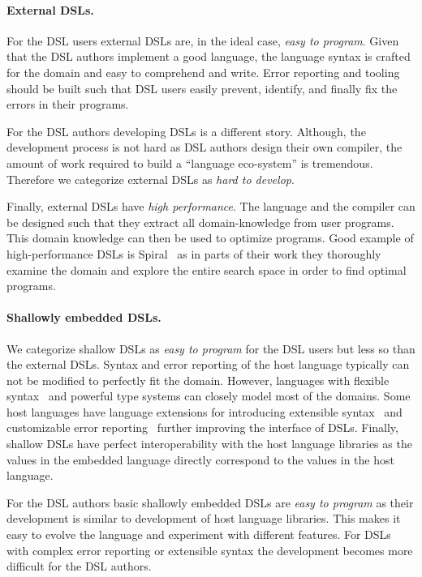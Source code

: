 \paragraph{External DSLs.} For the DSL users external DSLs are, in the ideal case, \emph{easy to program}. Given that
the DSL authors implement a good language, the language syntax is crafted for the domain
and easy to comprehend and write. Error reporting and tooling should be built such that DSL users
easily prevent, identify, and finally fix the errors in their programs.

For the DSL authors developing DSLs is a different story. Although, the development
process is not hard as DSL authors design their own compiler, the amount of work
required to build a ``language eco-system'' is tremendous. Therefore we categorize
external DSLs as \emph{hard to develop}.

Finally, external DSLs have \emph{high performance}. The language and the compiler can be
designed such that they extract all domain-knowledge from user programs. This domain knowledge
can then be used to optimize programs. Good example of high-performance DSLs is Spiral~\cite{puschel2005spiral}
as in parts of their work they thoroughly examine the domain and explore the entire
search space in order to find optimal programs.


\paragraph{Shallowly embedded DSLs.} We categorize shallow DSLs as \emph{easy to program} for
 the DSL users but less so than the external DSLs. Syntax and error reporting of the host language
 typically can not be modified to perfectly fit the domain. However, languages with flexible syntax~ and
 powerful type systems can closely model most of the domains. Some host languages have language extensions for
 introducing extensible syntax~ and customizable error reporting~ further
 improving the interface of DSLs. Finally, shallow DSLs have perfect interoperability with
 the host language libraries as the values in the embedded language directly correspond
 to the values in the host language.

For the DSL authors basic shallowly embedded DSLs are \emph{easy to program} as their
 development is similar to development of host language libraries. This makes it easy
 to evolve the language and experiment with different features. For DSLs
 with complex error reporting or extensible syntax the development
 becomes more difficult for the DSL authors.

